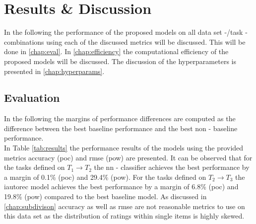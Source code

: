 \section{Results \& Discussion}
In the following the performance of the proposed models on all data set -/task - combinations using each of the discussed metrics will be discussed. This will be done in \autoref{chap:eval}. In \autoref{chap:efficiency} the computational efficiency of the proposed models will be discussed. The discussion of the hyperparameters is presented in \autoref{chap:hyperparams}.

\subsection{Evaluation}
\label{chap:eval}
In the following the margins of performance differences are computed as the difference between the best baseline performance and the best non - baseline performance.\\ 

\noindent In Table \ref{tab:results} the performance results of the models using the provided metrics accuracy (\acrshort{poc}) and \acrshort{rmse} (\acrshort{pow}) are presented. It can be observed that for the tasks defined on $T_1 \to T_2$ the \acrfull{nn} - classifier achieves the best performance by a margin of 0.1\% (\acrshort{poc}) and 29.4\% (\acrshort{pow}). For the tasks defined on $T_2 \to T_3$ the \acrshort{iautorec} model achieves the best performance by a margin of 6.8\% (\acrshort{poc}) and 19.8\% (\acrshort{pow}) compared to the best baseline model. As discussed in \ref{chap:subdivison} accuracy as well as \acrshort{rmse} are not reasonable metrics to use on this data set as the distribution of ratings within single items is highly skewed.

